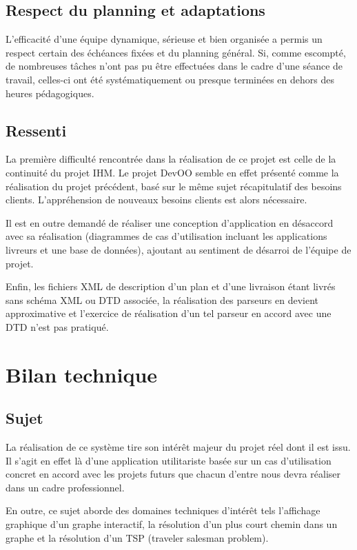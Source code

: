\subsection{Respect du planning et adaptations}
L’efficacité d’une équipe dynamique, sérieuse et bien organisée a permis un respect certain des échéances fixées et du planning général. Si, comme escompté, de nombreuses tâches n'ont pas pu être effectuées dans le cadre d’une séance de travail, celles-ci ont été systématiquement ou presque terminées en dehors des heures pédagogiques.

\subsection{Ressenti}
La première difficulté rencontrée dans la réalisation de ce projet est celle de la continuité du projet IHM. Le projet DevOO semble en effet présenté comme la réalisation du projet précédent, basé sur le même sujet récapitulatif des besoins clients. L'appréhension de nouveaux besoins clients est alors nécessaire.

Il est en outre demandé de réaliser une conception d'application en désaccord avec sa réalisation (diagrammes de cas d'utilisation incluant les applications livreurs et une base de données), ajoutant au sentiment de désarroi de l'équipe de projet.

Enfin, les fichiers XML de description d'un plan et d'une livraison étant livrés sans schéma XML ou DTD associée, la réalisation des parseurs en devient approximative et l'exercice de réalisation d'un tel parseur en accord avec une DTD n'est pas pratiqué.
\clearpage

\section{Bilan technique}
\subsection{Sujet}
La réalisation de ce système tire son intérêt majeur du projet réel dont il est issu. Il s’agit en effet là d’une application utilitariste basée sur un cas d’utilisation concret en accord avec les projets futurs que chacun d’entre nous devra réaliser dans un cadre professionnel.

En outre, ce sujet aborde des domaines techniques d'intérêt tels l'affichage graphique d'un graphe interactif, la résolution d'un plus court chemin dans un graphe et la résolution d'un TSP (traveler salesman problem).

